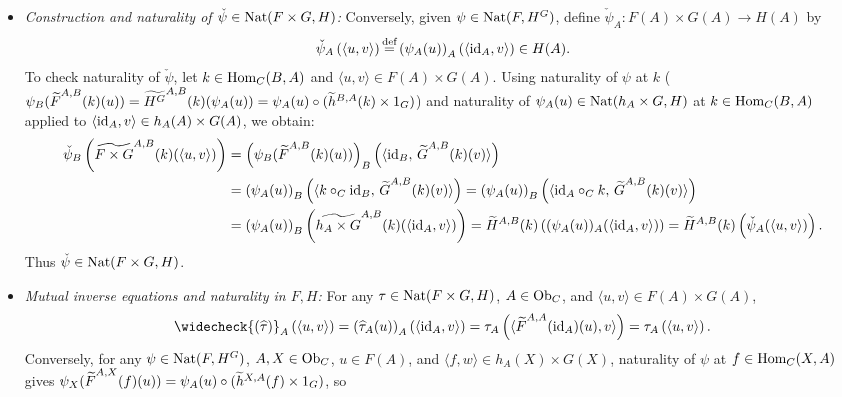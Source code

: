 \documentclass[10pt,a4paper]{article}
\begin{document}
\begin{enumerate}
\begin{itemize}
$$\widetilde{H^G}^{A,B}(k)\left(\widehat{\tau}_A(u)\right) = \tau \circ (\Phi_{A,F}(u) \times 1_G) \circ (\widetilde{h}^{B,A}(k) \times 1_G) = \tau \circ \left((\Phi_{A,F}(u) \circ \widetilde{h}^{B,A}(k)) \times 1_G\right) = \tau \circ \left(\Phi_{B,F}(\FMor^{A,B}(k)(u)) \times 1_G\right) = \widehat{\tau}_B\left(\FMor^{A,B}(k)(u)\right).$$
Thus $\widehat{\tau} \in \Nat(F, H^G)$.
\item \emph{Construction and naturality of $\check{\psi} \in {\textrm{Nat}}(F \times G, H)$:} Conversely, given $\psi \in {\textrm{Nat}}(F, H^G)$, define $\check{\psi}_A : F(A) \times G(A) \to H(A)$ by
$$\check{\psi}_A\left(\langle u, v \rangle\right) {\stackrel{{\textrm{def}}}{=}} \left(\psi_A(u)\right)_A\left(\langle {\textrm{id}}_A, v \rangle\right) \in H(A).$$
To check naturality of $\check{\psi}$, let $k \in {\textrm{Hom}}_C(B, A)$ and $\langle u, v \rangle \in F(A) \times G(A)$. Using naturality of $\psi$ at $k$ ($\psi_B({\widetilde{F}\textrm{}}^{A,B}(k)(u)) = \widetilde{H^G}^{A,B}(k)(\psi_A(u)) = \psi_A(u) \circ (\widetilde{h}^{B,A}(k) \times 1_G)$) and naturality of $\psi_A(u) \in {\textrm{Nat}}(h_A \times G, H)$ at $k \in {\textrm{Hom}}_C(B, A)$ applied to $\langle {\textrm{id}}_A, v \rangle \in h_A(A) \times G(A)$, we obtain:
\begin{align*}
\check{\psi}_B\left(\widetilde{F \times G}^{A,B}(k)(\langle u, v \rangle)\right) &= \left(\psi_B({\widetilde{F}\textrm{}}^{A,B}(k)(u))\right)_B\left(\langle {\textrm{id}}_B,\, {\widetilde{G}\textrm{}}^{A,B}(k)(v) \rangle\right) \\
&= \left(\psi_A(u)\right)_B\left(\langle k \circ_C {\textrm{id}}_B,\, {\widetilde{G}\textrm{}}^{A,B}(k)(v) \rangle\right) = \left(\psi_A(u)\right)_B\left(\langle {\textrm{id}}_A \circ_C k,\, {\widetilde{G}\textrm{}}^{A,B}(k)(v) \rangle\right) \\
&= \left(\psi_A(u)\right)_B\left(\widetilde{h_A \times G}^{A,B}(k)(\langle {\textrm{id}}_A, v \rangle)\right) = \widetilde{H}^{A,B}(k)\left((\psi_A(u))_A(\langle {\textrm{id}}_A, v \rangle)\right) = \widetilde{H}^{A,B}(k)\left(\check{\psi}_A(\langle u, v \rangle)\right).
\end{align*}
Thus $\check{\psi} \in {\textrm{Nat}}(F \times G, H)$.
\item \emph{Mutual inverse equations and naturality in $F, H$:} For any $\tau \in {\textrm{Nat}}(F \times G, H)$, $A \in {\textrm{Ob}}_C$, and $\langle u, v \rangle \in F(A) \times G(A)$,
$$\widecheck{(\widehat{\tau})}_A\left(\langle u, v \rangle\right) = \left(\widehat{\tau}_A(u)\right)_A\left(\langle \id_A, v \rangle\right) = \tau_A\left(\langle \FMor^{A,A}(\id_A)(u), v \rangle\right) = \tau_A\left(\langle u, v \rangle\right).$$
Conversely, for any $\psi \in {\textrm{Nat}}(F, H^G)$, $A, X \in {\textrm{Ob}}_C$, $u \in F(A)$, and $\langle f, w \rangle \in h_A(X) \times G(X)$, naturality of $\psi$ at $f \in {\textrm{Hom}}_C(X, A)$ gives $\psi_X({\widetilde{F}\textrm{}}^{A,X}(f)(u)) = \psi_A(u) \circ (\widetilde{h}^{X,A}(f) \times 1_G)$, so

\end{itemize}
\end{enumerate}
\end{document}
